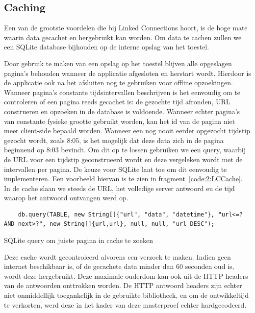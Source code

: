 \subsection{Caching}
Een van de grootste voordelen die bij Linked Connections hoort, is de hoge mate waarin data gecachet en hergebruikt kan worden. Om data te cachen zullen we een SQLite database bijhouden op de interne opslag van het toestel.

Door gebruik te maken van een opslag op het toestel blijven alle opgeslagen pagina's behouden wanneer de applicatie afgesloten en herstart wordt. Hierdoor is de applicatie ook na het afsluiten nog te gebruiken voor offline opzoekingen. Wanneer pagina's constante tijdsintervallen beschrijven is het eenvoudig om te controleren of een pagina reeds gecachet is: de gezochte tijd afronden, URL construeren en opzoeken in de database is voldoende. Wanneer echter pagina's van constante fysieke grootte gebruikt worden, kan het id van de pagina niet meer client-side bepaald worden. Wanneer een nog nooit eerder opgezocht tijdstip gezocht wordt, zoals 8:05, is het mogelijk dat deze data zich in de pagina beginnend op 8:03 bevindt. Om dit op te lossen gebruiken we een query, waarbij de URL voor een tijdstip geconstrueerd wordt en deze vergeleken wordt met de intervallen per pagina. De keuze voor SQLite laat toe om dit eenvoudig te implementeren. Een voorbeeld hiervan is te zien in fragment~\ref{code:2:LCCache}. In de cache slaan we steeds de URL, het volledige server antwoord en de tijd waarop het antwoord ontvangen werd op.

\begin{listing}[h]
	\begin{verbatim}
    db.query(TABLE, new String[]{"url", "data", "datetime"}, "url<=? AND next>?", new String[]{url,url}, null, null, "url DESC");
	\end{verbatim}
	\caption[Zoeken van pagina's in offline cache]{SQLite query om juiste pagina in cache te zoeken}
	\label{code:2:LCCache}
\end{listing}

Deze cache wordt gecontroleerd alvorens een verzoek te maken. Indien geen internet beschikbaar is, of de gecachete data minder dan 60 seconden oud is, wordt deze hergebruikt. Deze maximale ouderdom kan ook uit de HTTP-headers van de antwoorden onttrokken worden. De HTTP antwoord headers zijn echter niet onmiddellijk toegankelijk in de gebruikte bibliotheek, en om de ontwikkeltijd te verkorten, werd deze in het kader van deze masterproef echter hardgecodeerd.

